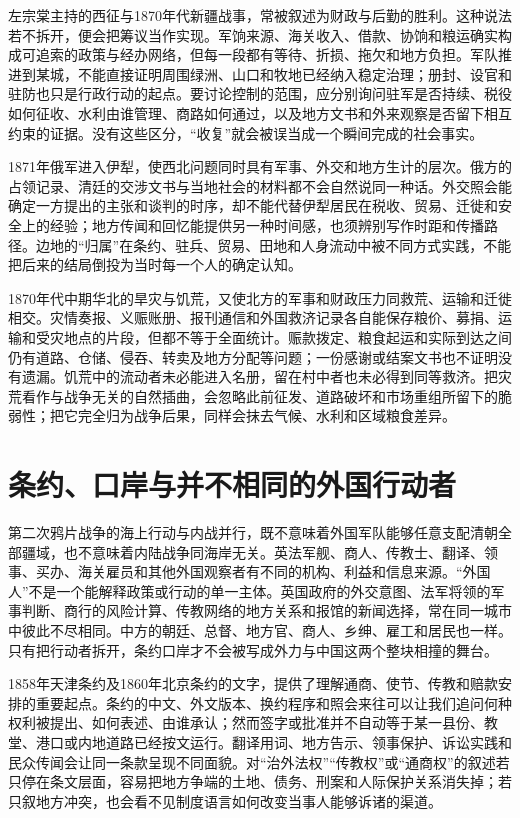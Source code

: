 左宗棠主持的西征与1870年代新疆战事，常被叙述为财政与后勤的胜利。这种说法若不拆开，便会把筹议当作实现。军饷来源、海关收入、借款、协饷和粮运确实构成可追索的政策与经办网络，但每一段都有等待、折损、拖欠和地方负担。军队推进到某城，不能直接证明周围绿洲、山口和牧地已经纳入稳定治理；册封、设官和驻防也只是行政行动的起点。要讨论控制的范围，应分别询问驻军是否持续、税役如何征收、水利由谁管理、商路如何通过，以及地方文书和外来观察是否留下相互约束的证据。没有这些区分，“收复”就会被误当成一个瞬间完成的社会事实。

1871年俄军进入伊犁，使西北问题同时具有军事、外交和地方生计的层次。俄方的占领记录、清廷的交涉文书与当地社会的材料都不会自然说同一种话。外交照会能确定一方提出的主张和谈判的时序，却不能代替伊犁居民在税收、贸易、迁徙和安全上的经验；地方传闻和回忆能提供另一种时间感，也须辨别写作时距和传播路径。边地的“归属”在条约、驻兵、贸易、田地和人身流动中被不同方式实践，不能把后来的结局倒投为当时每一个人的确定认知。

1870年代中期华北的旱灾与饥荒，又使北方的军事和财政压力同救荒、运输和迁徙相交。灾情奏报、义赈账册、报刊通信和外国救济记录各自能保存粮价、募捐、运输和受灾地点的片段，但都不等于全面统计。赈款拨定、粮食起运和实际到达之间仍有道路、仓储、侵吞、转卖及地方分配等问题；一份感谢或结案文书也不证明没有遗漏。饥荒中的流动者未必能进入名册，留在村中者也未必得到同等救济。把灾荒看作与战争无关的自然插曲，会忽略此前征发、道路破坏和市场重组所留下的脆弱性；把它完全归为战争后果，同样会抹去气候、水利和区域粮食差异。

\section{条约、口岸与并不相同的外国行动者}

第二次鸦片战争的海上行动与内战并行，既不意味着外国军队能够任意支配清朝全部疆域，也不意味着内陆战争同海岸无关。英法军舰、商人、传教士、翻译、领事、买办、海关雇员和其他外国观察者有不同的机构、利益和信息来源。“外国人”不是一个能解释政策或行动的单一主体。英国政府的外交意图、法军将领的军事判断、商行的风险计算、传教网络的地方关系和报馆的新闻选择，常在同一城市中彼此不尽相同。中方的朝廷、总督、地方官、商人、乡绅、雇工和居民也一样。只有把行动者拆开，条约口岸才不会被写成外力与中国这两个整块相撞的舞台。

1858年天津条约及1860年北京条约的文字，提供了理解通商、使节、传教和赔款安排的重要起点。条约的中文、外文版本、换约程序和照会来往可以让我们追问何种权利被提出、如何表述、由谁承认；然而签字或批准并不自动等于某一县份、教堂、港口或内地道路已经按文运行。翻译用词、地方告示、领事保护、诉讼实践和民众传闻会让同一条款呈现不同面貌。对“治外法权”“传教权”或“通商权”的叙述若只停在条文层面，容易把地方争端的土地、债务、刑案和人际保护关系消失掉；若只叙地方冲突，也会看不见制度语言如何改变当事人能够诉诸的渠道。

